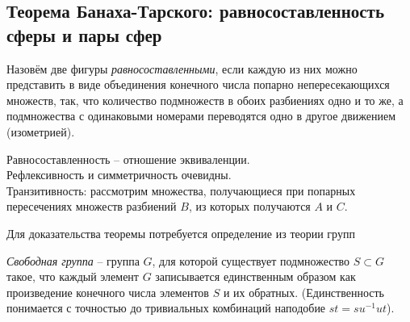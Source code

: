 \subsection{Теорема Банаха-Тарского: равносоставленность сферы и пары сфер}

\begin{definition}
    Назовём две фигуры \textit{равносоставленными}, если каждую из них можно представить в виде объединения конечного числа попарно непересекающихся множеств, так, что количество подмножеств в обоих разбиениях одно и то же, а подмножества с одинаковыми номерами переводятся одно в другое движением (изометрией).
\end{definition}

\begin{proposition}
    Равносоставленность -- отношение эквиваленции.\\
    Рефлексивность и симметричность очевидны.\\
    Транзитивность: рассмотрим множества, получающиеся при попарных пересечениях множеств разбиений $B$, из которых получаются $A$ и $C$.
\end{proposition}

Для доказательства теоремы потребуется определение из теории групп\\

\begin{definition}
    \textit{Свободная группа} -- группа $G$, для которой существует подмножество $S \subset G$ такое, что каждый элемент $G$ записывается единственным образом как произведение конечного числа элементов $S$ и их обратных. (Единственность понимается с точностью до тривиальных комбинаций наподобие $st = su^{-1}ut$).
\end{definition}

